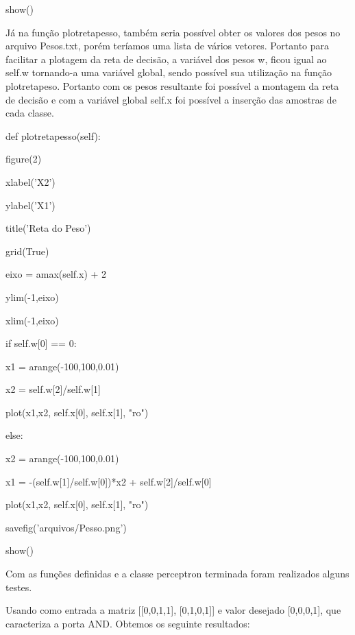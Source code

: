 \documentclass[
12pt, 
a4paper,
oneside,			%
english,			%
french,				%
spanish,			%
brazil,	
]{abntex2}
\begin{document}
 show()
 


 \setlength{\parindent}{1 cm}
 
Já na função plotretapesso, também seria possível obter os valores dos pesos no arquivo Pesos.txt, porém teríamos uma lista de vários vetores. Portanto para facilitar a plotagem da reta de decisão, a variável dos pesos w, ficou igual ao self.w tornando-a uma variável global, sendo possível sua utilização na função plotretapeso. Portanto com os pesos resultante foi possível a montagem da reta de decisão e com a variável global self.x foi possível a inserção das amostras de cada classe. 
 	
 def plotretapesso(self):
 
 \setlength{\parindent}{1,5 cm}
 
 figure(2)
 
 xlabel('X2')
 
 ylabel('X1')
 
 title('Reta do Peso')
 
 grid(True)
 
 eixo = amax(self.x) + 2
 
 ylim(-1,eixo)
 
 xlim(-1,eixo)
 
 if self.w[0] == 0:
 
 \hspace{0,5cm}x1 = arange(-100,100,0.01)
 
 \hspace{0,5cm}x2 = self.w[2]/self.w[1]
 
 \hspace{0,5cm}plot(x1,x2, self.x[0], self.x[1], "ro")
 
 else:
 
 \hspace{0,5cm}x2 = arange(-100,100,0.01)
 
 \hspace{0,5cm}x1 = -(self.w[1]/self.w[0])*x2 + self.w[2]/self.w[0]
 
 \hspace{0,5cm}plot(x1,x2, self.x[0], self.x[1], "ro")
 
 savefig('arquivos/Pesso.png') 
 
 show()
 
\setlength{\parindent}{1,0 cm} 

Com as funções definidas e a classe perceptron terminada foram realizados alguns testes. 

Usando como entrada a matriz [[0,0,1,1], [0,1,0,1]] e valor desejado [0,0,0,1], que caracteriza a porta AND. Obtemos os seguinte resultados:
\end{document}
